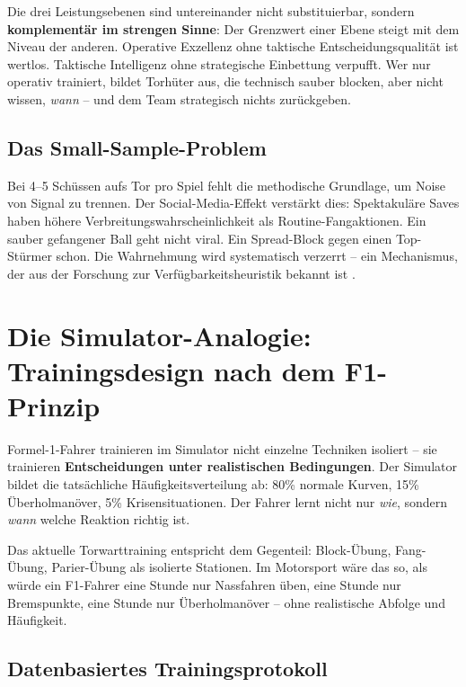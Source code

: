 \documentclass[12pt,a4paper]{article}
\begin{document}
Die drei Leistungsebenen sind untereinander nicht substituierbar, sondern \textbf{komplement\"ar im strengen Sinne}: Der Grenzwert einer Ebene steigt mit dem Niveau der anderen. Operative Exzellenz ohne taktische Entscheidungsqualit\"at ist wertlos. Taktische Intelligenz ohne strategische Einbettung verpufft. Wer nur operativ trainiert, bildet Torh\"uter aus, die technisch sauber blocken, aber nicht wissen, \emph{wann} -- und dem Team strategisch nichts zur\"uckgeben.


\subsection{Das Small-Sample-Problem}
\label{sec:small-sample}

Bei 4--5 Sch\"ussen aufs Tor pro Spiel fehlt die methodische Grundlage, um Noise von Signal zu trennen. Der Social-Media-Effekt verst\"arkt dies: Spektakul\"are Saves haben h\"ohere Verbreitungswahrscheinlichkeit als Routine-Fangaktionen. Ein sauber gefangener Ball geht nicht viral. Ein Spread-Block gegen einen Top-St\"urmer schon. Die Wahrnehmung wird systematisch verzerrt -- ein Mechanismus, der aus der Forschung zur Verf\"ugbarkeitsheuristik bekannt ist \citep{tversky1973availability}.


\section{Die Simulator-Analogie: Trainingsdesign nach dem F1-Prinzip}
\label{sec:simulator}

Formel-1-Fahrer trainieren im Simulator nicht einzelne Techniken isoliert -- sie trainieren \textbf{Entscheidungen unter realistischen Bedingungen}. Der Simulator bildet die tats\"achliche H\"aufigkeitsverteilung ab: 80\% normale Kurven, 15\% \"Uberholman\"over, 5\% Krisensituationen. Der Fahrer lernt nicht nur \emph{wie}, sondern \emph{wann} welche Reaktion richtig ist.

Das aktuelle Torwarttraining entspricht dem Gegenteil: Block-\"Ubung, Fang-\"Ubung, Parier-\"Ubung als isolierte Stationen. Im Motorsport w\"are das so, als w\"urde ein F1-Fahrer eine Stunde nur Nassfahren \"uben, eine Stunde nur Bremspunkte, eine Stunde nur \"Uberholman\"over -- ohne realistische Abfolge und H\"aufigkeit.


\subsection{Datenbasiertes Trainingsprotokoll}
\label{sec:trainingsprotokoll}
\end{document}
